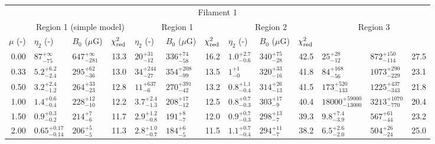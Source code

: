 \begin{tabular}{@{}r llr llr llr llr@{}}

\toprule
\multicolumn{13}{c}{Filament 1} \\
\cmidrule{1-13}
{} & \multicolumn{3}{c}{Region 1 (simple model)}
   & \multicolumn{3}{c}{Region 1}
   & \multicolumn{3}{c}{Region 2}
   & \multicolumn{3}{c}{Region 3} \\
\cmidrule(lr){2-4} \cmidrule(lr){5-7} \cmidrule(lr){8-10} \cmidrule(l){11-13}
$\mu$ (-) & $\eta_2$ (-) & $B_0$ ($\mu$G) & $\chi^2_{\mathrm{red}}$
          & $\eta_2$ (-) & $B_0$ ($\mu$G) & $\chi^2_{\mathrm{red}}$
          & $\eta_2$ (-) & $B_0$ ($\mu$G) & $\chi^2_{\mathrm{red}}$ \\
\cmidrule{1-13}
0.00 & ${87}^{+\infty}_{-75}$ & ${647}^{+\infty}_{-281}$ & 13.3
     & ${20}^{+31}_{-12}$ & ${336}^{+74}_{-58}$ & 16.2
     & ${1.0}^{+2.7}_{-0.6}$ & ${340}^{+75}_{-28}$ & 42.5
     & ${25}^{+28}_{-12}$ & ${872}^{+150}_{-114}$ & 27.5 \\
0.33 & ${5.2}^{+6.2}_{-2.4}$ & ${295}^{+62}_{-36}$ & 13.0
     & ${34}^{+244}_{-27}$ & ${354}^{+208}_{-99}$ & 13.5
     & ${1}^{+1}_{-0}$ & ${320}^{+33}_{-16}$ & 41.8
     & ${84}^{+168}_{-56}$ & ${1073}^{+290}_{-229}$ & 23.1 \\
0.50 & ${3.2}^{+2.4}_{-1.2}$ & ${264}^{+33}_{-23}$ & 12.8
     & ${11}^{+637}_{-6}$ & ${270}^{+391}_{-42}$ & 13.2
     & ${0.8}^{+1.1}_{-0.4}$ & ${314}^{+26}_{-13}$ & 41.5
     & ${173}^{+520}_{-133}$ & ${1225}^{+437}_{-343}$ & 21.8 \\
1.00 & ${1.4}^{+0.6}_{-0.4}$ & ${228}^{+12}_{-10}$ & 12.2
     & ${3.7}^{+2.4}_{-1.3}$ & ${208}^{+17}_{-12}$ & 12.5
     & ${0.8}^{+0.7}_{-0.3}$ & ${303}^{+17}_{-9}$ & 40.4
     & ${18000}^{+59000}_{-13000}$ & ${3213}^{+1070}_{-770}$ & 20.4 \\
1.50 & ${0.9}^{+0.3}_{-0.2}$ & ${214}^{+7}_{-6}$ & 11.7
     & ${2.9}^{+1.2}_{-0.8}$ & ${191}^{+8}_{-7}$ & 12.0
     & ${0.9}^{+0.7}_{-0.3}$ & ${298}^{+13}_{-7}$ & 39.3
     & ${9.8}^{+7.4}_{-3.9}$ & ${567}^{+61}_{-44}$ & 23.2 \\
2.00 & ${0.65}^{+0.17}_{-0.14}$ & ${206}^{+5}_{-5}$ & 11.3
     & ${2.8}^{+1.0}_{-0.7}$ & ${184}^{+6}_{-5}$ & 11.5
     & ${1.1}^{+0.7}_{-0.4}$ & ${294}^{+11}_{-7}$ & 38.2
     & ${6.5}^{+2.6}_{-2.0}$ & ${504}^{+26}_{-24}$ & 25.0 \\


\end{tabular}
